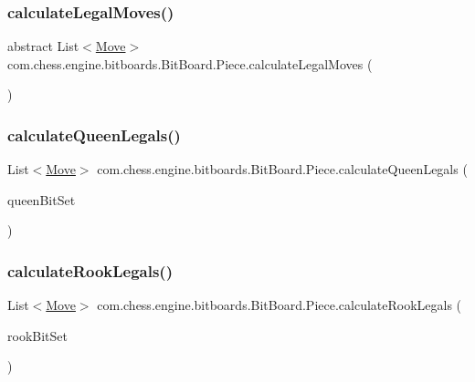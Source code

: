 \subsubsection{\texorpdfstring{calculateLegalMoves()}{calculateLegalMoves()}}
{\footnotesize\ttfamily abstract List$<$\mbox{\hyperlink{classcom_1_1chess_1_1engine_1_1bitboards_1_1_move}{Move}}$>$ com.\+chess.\+engine.\+bitboards.\+Bit\+Board.\+Piece.\+calculate\+Legal\+Moves (\begin{DoxyParamCaption}{ }\end{DoxyParamCaption})\hspace{0.3cm}{\ttfamily [abstract]}}

\mbox{\label{enumcom_1_1chess_1_1engine_1_1bitboards_1_1_bit_board_1_1_piece_ad5088261ffd0bc39a292f025118f3d78}} 
\subsubsection{\texorpdfstring{calculateQueenLegals()}{calculateQueenLegals()}}
{\footnotesize\ttfamily List$<$\mbox{\hyperlink{classcom_1_1chess_1_1engine_1_1bitboards_1_1_move}{Move}}$>$ com.\+chess.\+engine.\+bitboards.\+Bit\+Board.\+Piece.\+calculate\+Queen\+Legals (\begin{DoxyParamCaption}\item[{final \mbox{\hyperlink{classcom_1_1chess_1_1engine_1_1bitboards_1_1_chess_bit_set}{Chess\+Bit\+Set}}}]{queen\+Bit\+Set }\end{DoxyParamCaption})}

\mbox{\label{enumcom_1_1chess_1_1engine_1_1bitboards_1_1_bit_board_1_1_piece_af4b6a186a193104cb243f5cca1f863c7}} 
\subsubsection{\texorpdfstring{calculateRookLegals()}{calculateRookLegals()}}
{\footnotesize\ttfamily List$<$\mbox{\hyperlink{classcom_1_1chess_1_1engine_1_1bitboards_1_1_move}{Move}}$>$ com.\+chess.\+engine.\+bitboards.\+Bit\+Board.\+Piece.\+calculate\+Rook\+Legals (\begin{DoxyParamCaption}\item[{final \mbox{\hyperlink{classcom_1_1chess_1_1engine_1_1bitboards_1_1_chess_bit_set}{Chess\+Bit\+Set}}}]{rook\+Bit\+Set }\end{DoxyParamCaption})}


